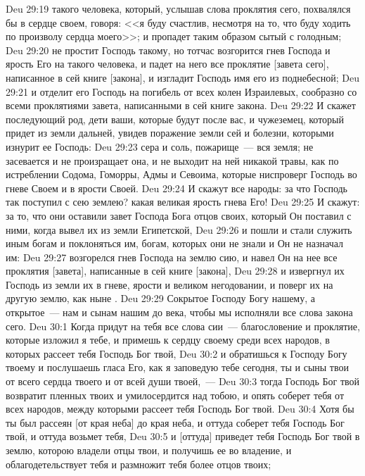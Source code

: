 \vs Deu 29:19 такого человека, который, услышав слова проклятия сего, похвалялся бы в сердце своем, говоря: <<я буду счастлив, несмотря на то, что буду ходить по произволу сердца моего>>; и пропадет таким образом сытый с голодным;
\vs Deu 29:20 не простит Господь такому, но тотчас возгорится гнев Господа и ярость Его на такого человека, и падет на него все проклятие [завета сего], написанное в сей книге [закона], и изгладит Господь имя его из поднебесной;
\vs Deu 29:21 и отделит его Господь на погибель от всех колен Израилевых, сообразно со всеми проклятиями завета, написанными в сей книге закона.
\vs Deu 29:22 И скажет последующий род, дети ваши, которые будут после вас, и чужеземец, который придет из земли дальней, увидев поражение земли сей и болезни, которыми изнурит ее Господь:
\vs Deu 29:23 сера и соль, пожарище~--- вся земля; не засевается и не произращает она, и не выходит на ней никакой травы, как по истреблении Содома, Гоморры, Адмы и Севоима, которые ниспроверг Господь во гневе Своем и в ярости Своей.
\vs Deu 29:24 И скажут все народы: за что Господь так поступил с сею землею? какая великая ярость гнева Его!
\vs Deu 29:25 И скажут: за то, что они оставили завет Господа Бога отцов своих, который Он поставил с ними, когда вывел их из земли Египетской,
\vs Deu 29:26 и пошли и стали служить иным богам и поклоняться им, богам, которых они не знали и  Он не назначал им:
\vs Deu 29:27  возгорелся гнев Господа на землю сию, и навел Он на нее все проклятия [завета], написанные в сей книге [закона],
\vs Deu 29:28 и извергнул их Господь из земли их в гневе, ярости и великом негодовании, и поверг их на другую землю, как ныне .
\vs Deu 29:29 Сокрытое  Господу Богу нашему, а открытое~--- нам и сынам нашим до века, чтобы мы исполняли все слова закона сего.
\vs Deu 30:1 Когда придут на тебя все слова сии~--- благословение и проклятие, которые изложил я тебе, и примешь  к сердцу своему среди всех народов, в которых рассеет тебя Господь Бог твой,
\vs Deu 30:2 и обратишься к Господу Богу твоему и послушаешь гласа Его, как я заповедую тебе сегодня, ты и сыны твои от всего сердца твоего и от всей души твоей,~---
\vs Deu 30:3 тогда Господь Бог твой возвратит пленных твоих и умилосердится над тобою, и опять соберет тебя от всех народов, между которыми рассеет тебя Господь Бог твой.
\vs Deu 30:4 Хотя бы ты был рассеян [от края неба] до края неба, и оттуда соберет тебя Господь Бог твой, и оттуда возьмет тебя,
\vs Deu 30:5 и [оттуда] приведет тебя Господь Бог твой в землю, которою владели отцы твои, и получишь ее во владение, и облагодетельствует тебя и размножит тебя более отцов твоих;

